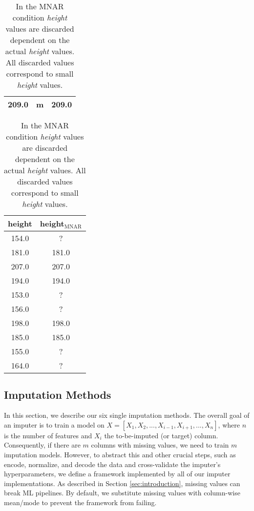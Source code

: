 \begin{table}
\begin{minipage}{0.3\textwidth}
\begin{tabular}{ccc}
  209.0 &      m &                209.0 \\
\bottomrule
\end{tabular}
\caption{In the MAR condition \textit{height} values are discarded dependent on values in another column,  here \textit{gender}. All discarded \textit{height} values correspond to rows in which \textit{gender} was \textit{male}.
}
	\label{tab:missingness_patterns_MAR}
\end{minipage}
\hfill
\begin{minipage}{0.28\textwidth}
\centering
	\begin{tabular}{cc}
\toprule
 height &  height$_{\text{MNAR}}$ \\
\midrule
  154.0 &                     ? \\
  181.0 &                 181.0 \\
  207.0 &                 207.0 \\
  194.0 &                 194.0 \\
  153.0 &                     ? \\
  156.0 &                     ? \\
  198.0 &                 198.0 \\
  185.0 &                 185.0 \\
  155.0 &                     ? \\
  164.0 &                     ? \\
\bottomrule
\end{tabular}
\caption{In the MNAR condition \textit{height} values are discarded dependent on the actual \textit{height} values. All discarded values correspond to small \textit{height} values.
}
	\label{tab:missingness_patterns_MNAR}
\vspace{1em}
\end{minipage}

\end{table}


\subsection{Imputation Methods}
\label{sec:methods:impuation}
%
In this section, we describe our six single imputation methods. The overall goal of an imputer is to train a model on $X = [X_1, X_2, ..., X_{i-1}, X_{i+1}, ..., X_n]$, where $n$ is the number of features and $X_i$ the to-be-imputed (or target) column. Consequently, if there are $m$ columns with missing values, we need to train $m$ imputation models. However, to abstract this and other crucial steps, such as encode, normalize, and decode the data and cross-validate the imputer's hyperparameters, we define a framework implemented by all of our imputer implementations. As described in Section \ref{sec:introduction}, missing values can break ML pipelines. By default, we substitute missing values with column-wise mean/mode to prevent the framework from failing.

